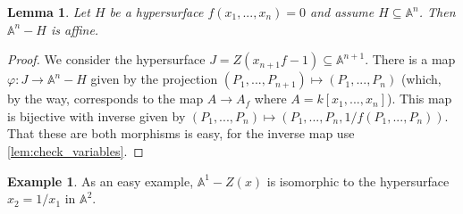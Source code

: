 \documentclass[12pt]{article}
\theoremstyle{plain}
\newtheorem{lemma}[thm]{Lemma}
\theoremstyle{definition}
\newtheorem{example}[thm]{Example}
\newcommand{\bb}[1]{\mathbb{#1}}
\newcommand{\lto}{\longrightarrow}
\begin{document}
\begin{lemma}
Let $H$ be a hypersurface $f(x_1,...,x_n) = 0$ and assume $H \subseteq \bb{A}^n$. Then $\bb{A}^n - H$ is affine.
\end{lemma}
\begin{proof}
We consider the hypersurface $J = Z(x_{n+1}f - 1) \subseteq \bb{A}^{n+1}$. There is a map $\varphi: J \lto \bb{A}^n - H$ given by the projection $(P_1,...,P_{n+1}) \longmapsto (P_1,...,P_n)$ (which, by the way, corresponds to the map $A \lto A_f$ where $A = k[x_1,...,x_n]$). This map is bijective with inverse given by $(P_1,...,P_n) \longmapsto (P_1,...,P_n,1/f(P_1,...,P_n))$. That these are both morphisms is easy, for the inverse map use \ref{lem:check_variables}.
\end{proof}
\begin{example}
As an easy example, $\bb{A}^1 - Z(x)$ is isomorphic to the hypersurface $x_2 = 1/x_1$ in $\bb{A}^2$.
\end{example}
\end{document}
